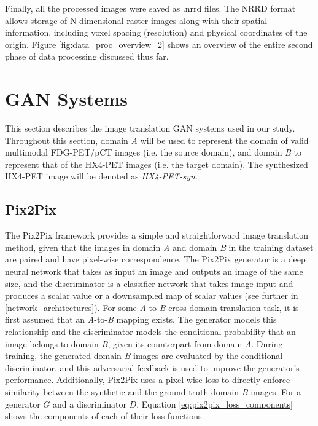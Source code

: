 Finally, all the processed images were saved as .nrrd files. The NRRD format allows storage of N-dimensional raster images along with their spatial information, including voxel spacing (resolution) and physical coordinates of the origin. Figure \ref{fig:data_proc_overview_2} shows an overview of the entire second phase of data processing discussed thus far.





\section{GAN Systems}
\label{GAN_Systems}

This section describes the image translation GAN systems used in our study. Throughout this section, domain \textit{A} will be used to represent the domain of valid multimodal FDG-PET/pCT images (i.e. the source domain), and domain \textit{B} to represent that of the HX4-PET images (i.e. the target domain). The synthesized HX4-PET image will be denoted as \textit{HX4-PET-syn}.


\subsection{Pix2Pix}
\label{pix2pix}
The Pix2Pix framework provides a simple and straightforward image translation method, given that the images in domain \textit{A} and domain \textit{B} in the training dataset are paired and have pixel-wise correspondence. The Pix2Pix generator is a deep neural network that takes as input an image and outputs an image of the same size, and the discriminator is a classifier network that takes image input and produces a scalar value or a downsampled map of scalar values (see further in \ref{network_architectures}). For some \textit{A}-to-\textit{B} cross-domain translation task, it is first assumed that an \textit{A}-to-\textit{B} mapping exists. The generator models this relationship and the discriminator models the conditional probability that an image belongs to domain \textit{B}, given its counterpart from domain \textit{A}. During training, the generated domain \textit{B} images are evaluated by the conditional discriminator, and this adversarial feedback is used to improve the generator's performance. Additionally, Pix2Pix uses a pixel-wise loss to directly enforce similarity between the synthetic and the ground-truth domain \textit{B} images. For a generator $G$ and a discriminator $D$, Equation \ref{eq:pix2pix_loss_components} shows the components of each of their loss functions. 

